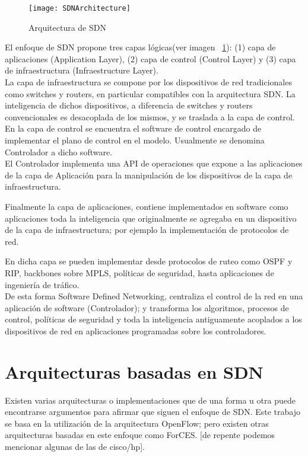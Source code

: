 \begin{figure}[htbp!] 
\centering    
\texttt{[image: SDNArchitecture]}
\caption[Capas de la arquitectura 4D]{Arquitectura de SDN}
\label{fig:SDNArchitecture}
\end{figure}

El enfoque de SDN propone tres capas lógicas(ver imagen ~\ref{fig:SDNArchitecture}): (1) capa de aplicaciones (Application Layer), (2) capa de control (Control Layer) y (3) capa de infraestructura (Infraestructure Layer).\\

La capa de infraestructura se compone por los dispositivos de red tradicionales como switches y routers, en particular compatibles con la arquitectura SDN. La inteligencia de dichos dispositivos, a diferencia de switches y routers convencionales es desacoplada de los mismos, y se traslada a la capa de control.\\

En la capa de control se encuentra el software de control encargado de implementar el plano de control en el modelo. Usualmente se denomina Controlador a dicho software.\\ El Controlador implementa una API de operaciones que expone a las aplicaciones de la capa de Aplicación para la manipulación de los dispositivos de la capa de infraestructura.

Finalmente la capa de aplicaciones, contiene implementados en software como aplicaciones toda la inteligencia que originalmente se agregaba en un dispositivo de la capa de infraestructura; por ejemplo la implementaci\'on de protocolos de red.

En dicha capa se pueden implementar desde protocolos de ruteo como OSPF y RIP, backbones sobre MPLS, políticas de seguridad, hasta aplicaciones de ingeniería de tráfico.\\

De esta forma Software Defined Networking, centraliza el control de la red en una aplicación de software (Controlador); y transforma los algoritmos, procesos de control, políticas de seguridad y toda la inteligencia antiguamente acoplados a los dispositivos de red en aplicaciones programadas sobre los controladores.\\

\section{Arquitecturas basadas en SDN}
Existen varias arquitecturas o implementaciones que de una forma u otra puede encontrarse argumentos para afirmar que siguen el enfoque de SDN. Este trabajo se basa en la utilización de la arquitectura OpenFlow; pero existen otras arquitecturas basadas en este enfoque como ForCES. [de repente podemos mencionar algunas de las de cisco/hp].

